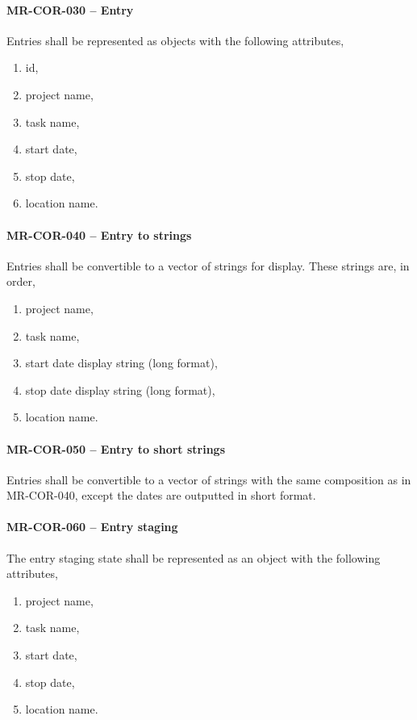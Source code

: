 \paragraph{MR-COR-030 -- Entry}
Entries shall be represented as objects with the following attributes,
\begin{enumerate}
\item id,
\item project name,
\item task name,
\item start date,
\item stop date,
\item location name.
\end{enumerate}

\paragraph{MR-COR-040 -- Entry to strings}
Entries shall be convertible to a vector of strings for display.
These strings are, in order,
\begin{enumerate}
\item project name,
\item task name,
\item start date display string (long format),
\item stop date display string (long format),
\item location name.
\end{enumerate}

\paragraph{MR-COR-050 -- Entry to short strings}
Entries shall be convertible to a vector of strings with the same composition
as in MR-COR-040, except the dates are outputted in short format.

\paragraph{MR-COR-060 -- Entry staging}
The entry staging state shall be represented as an object with the following
attributes,
\begin{enumerate}
\item project name,
\item task name,
\item start date,
\item stop date,
\item location name.
\end{enumerate}


